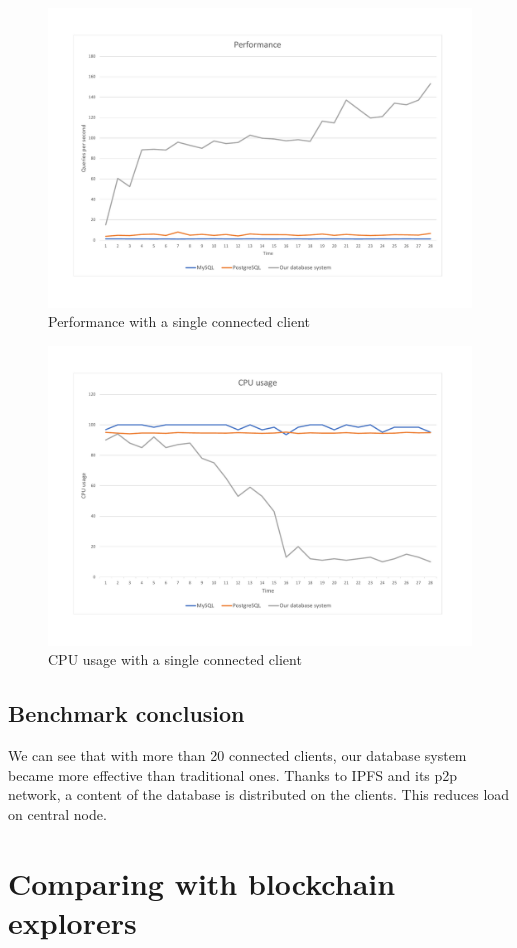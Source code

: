 \begin{figure}[H]
    \centering
    \includegraphics[width=.8\linewidth]{excel/150per.pdf}
    \caption{Performance with a single connected client}
    \label{bench150per}
\end{figure}
 

\begin{figure}[H]
    \centering
    \includegraphics[width=.8\linewidth]{excel/150cpu.pdf}
    \caption{CPU usage with a single connected client}
    \label{bench150cpu}
\end{figure}


\subsection{Benchmark conclusion}
We can see that with more than 20 connected clients, our database system became more effective than traditional ones. Thanks to IPFS and its p2p network, a content of the database is distributed on the clients. This reduces load on central node.

\section{Comparing with blockchain explorers}



